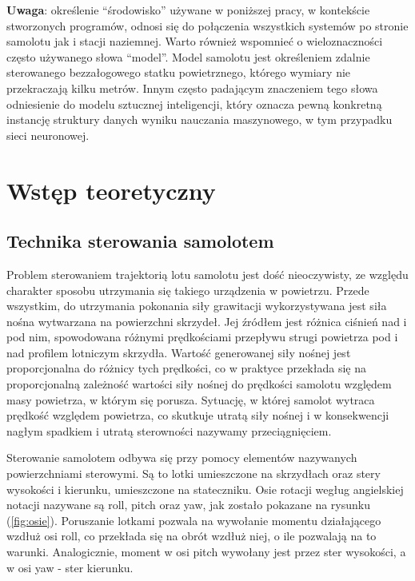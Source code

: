\documentclass[12pt, a4paper]{article}
\let\oldref\ref
\renewcommand{\ref}[1]{(\oldref{#1})}
\begin{document}
\textbf{Uwaga}: określenie ``środowisko'' używane w poniższej pracy, w kontekście stworzonych programów, odnosi się do połączenia wszystkich systemów po stronie samolotu jak i stacji naziemnej. Warto również wspomnieć o wieloznaczności często używanego słowa ``model''. Model samolotu jest określeniem zdalnie sterowanego bezzałogowego statku powietrznego, którego wymiary nie przekraczają kilku metrów. Innym często padającym znaczeniem tego słowa odniesienie do modelu sztucznej inteligencji, który oznacza pewną konkretną instancję struktury danych wyniku nauczania maszynowego, w tym przypadku sieci neuronowej.

\clearpage
\section{Wstęp teoretyczny}

\subsection{Technika sterowania samolotem}
Problem sterowaniem trajektorią lotu samolotu jest dość nieoczywisty, ze względu charakter sposobu utrzymania się takiego urządzenia w powietrzu. Przede wszystkim, do utrzymania pokonania siły grawitacji wykorzystywana jest siła nośna wytwarzana na powierzchni skrzydeł. Jej źródłem jest różnica ciśnień nad i pod nim, spowodowana różnymi prędkościami przepływu strugi powietrza pod i nad profilem lotniczym skrzydła. Wartość generowanej siły nośnej jest proporcjonalna do różnicy tych prędkości, co w praktyce przekłada się na proporcjonalną zależność wartości siły nośnej do prędkości samolotu względem masy powietrza, w którym się porusza. Sytuację, w której samolot wytraca prędkość względem powietrza, co skutkuje utratą siły nośnej i w konsekwencji nagłym spadkiem i utratą sterowności nazywamy przeciągnięciem.

Sterowanie samolotem odbywa się przy pomocy elementów nazywanych powierzchniami sterowymi. Są to lotki umieszczone na skrzydłach oraz stery wysokości i kierunku, umieszczone na stateczniku. Osie rotacji wegług angielskiej notacji nazywane są roll, pitch oraz yaw, jak zostało pokazane na rysunku \ref{fig:osie}. Poruszanie lotkami pozwala na wywołanie momentu działającego wzdłuż osi roll, co przekłada się na obrót wzdłuż niej, o ile pozwalają na to warunki. Analogicznie, moment w osi pitch wywołany jest przez ster wysokości, a w osi yaw - ster kierunku.
\end{document}
